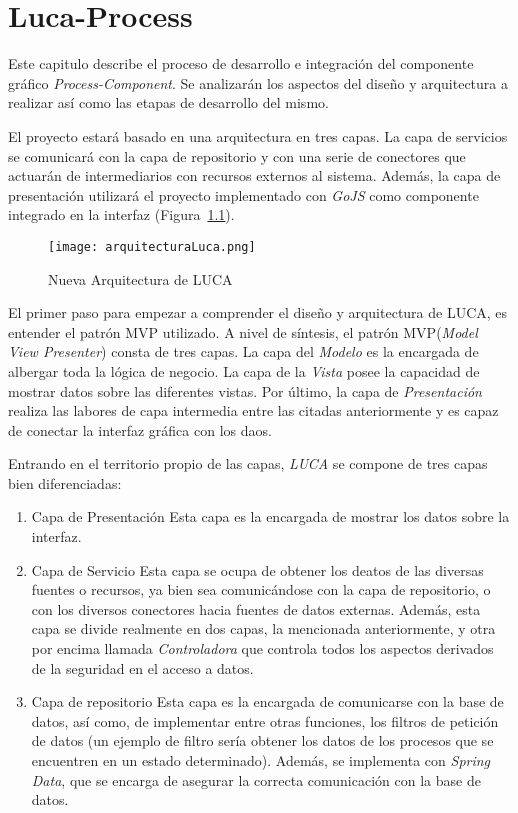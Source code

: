\chapter{Luca-Process}
	
Este capitulo describe el proceso de desarrollo e integración del componente gráfico \emph{Process-Component}. Se analizarán los aspectos del diseño y arquitectura a realizar así como las etapas de desarrollo del mismo.
	

El proyecto estará basado en una arquitectura en tres capas. La capa de servicios se comunicará con la capa de repositorio y con una serie de conectores que actuarán de intermediarios con recursos externos al sistema. Además, la capa de presentación utilizará el proyecto implementado con \emph{GoJS} como componente integrado en la interfaz (Figura~\ref{fig:arquitecturaLuca}).

\begin{figure}[H]
	\centering
	\texttt{[image: arquitecturaLuca.png]}
	\caption{Nueva Arquitectura de LUCA}\label{fig:arquitecturaLuca}
\end{figure}


El primer paso para empezar a comprender el diseño y arquitectura de LUCA, es entender el patrón MVP\cite{mvp} utilizado.
A nivel de síntesis, el patrón MVP(\emph{Model View Presenter}) consta de tres capas. La capa del \emph{Modelo} es la encargada de albergar toda la lógica de negocio. La capa de la \emph{Vista} posee la capacidad de mostrar datos sobre las diferentes vistas. Por último, la capa de \emph{Presentación} realiza las labores de capa intermedia entre las citadas anteriormente y es capaz de conectar la interfaz gráfica con los daos.


Entrando en el territorio propio de las capas, \emph{LUCA} se compone de tres capas bien diferenciadas:

\begin{enumerate}
	\item Capa de Presentación \subitem Esta capa es la encargada de mostrar los datos sobre la interfaz.
	\item Capa de Servicio \subitem Esta capa se ocupa de obtener los deatos de las diversas fuentes o recursos, ya bien sea comunicándose con la capa de repositorio, o con los diversos conectores hacia fuentes de datos externas. Además, esta capa se divide realmente en dos capas, la mencionada anteriormente, y otra por encima llamada \emph{Controladora} que controla todos los aspectos derivados de la seguridad en el acceso a datos.
	\item Capa de repositorio \subitem Esta capa es la encargada de comunicarse con la base de datos, así como, de implementar entre otras funciones, los filtros de petición de datos (un ejemplo de filtro sería obtener los datos de los procesos que se encuentren en un estado determinado). Además, se implementa con \emph{Spring Data}\cite{jpa}, que se encarga de asegurar la correcta comunicación con la base de datos.
\end{enumerate}



